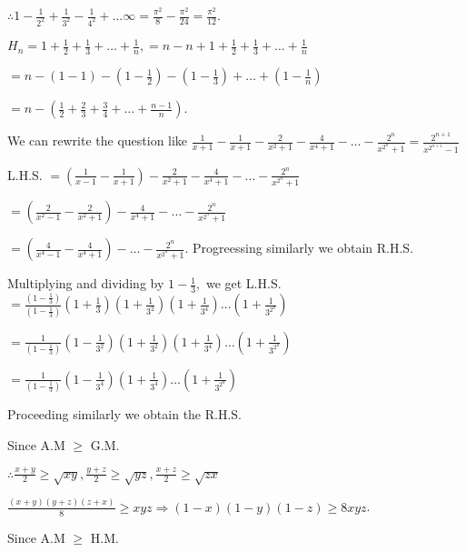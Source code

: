   $\therefore 1- \frac{1}{2^2} + \frac{1}{3^2} - \frac{1}{4^2} + \ldots \infty = \frac{\pi^2}{8} - \frac{\pi^2}{24} =
  \frac{\pi^2}{12}$.
\item $H_n = 1 + \frac{1}{2} + \frac{1}{3} + \ldots + \frac{1}{n}, = n - n + 1 + \frac{1}{2} + \frac{1}{3} +
  \ldots + \frac{1}{n}$

  $= n -\left(1 - 1\right) - \left(1 - \frac{1}{2}\right) - \left(1 - \frac{1}{3}\right) + \ldots + \left(1
  - \frac{1}{n}\right)$

  $= n - \left(\frac{1}{2} + \frac{2}{3} + \frac{3}{4} + \ldots + \frac{n - 1}{n}\right)$.
\item We can rewrite the question like $\frac{1}{x + 1} - \frac{1}{x + 1} - \frac{2}{x^2 + 1} - \frac{4}{x^4 + 1} -
  \ldots - \frac{2^n}{x^{2^{n}} + 1} = \frac{2^{n + 1}}{x^{2^{n + 1}} - 1}$

  L.H.S. $= \left(\frac{1}{x - 1} - \frac{1}{x + 1}\right) - \frac{2}{x^2 + 1} - \frac{4}{x^4 + 1} - \ldots
  - \frac{2^n}{x^{2^{n}} + 1}$

  $= \left(\frac{2}{x^2 - 1} - \frac{2}{x^2 + 1}\right) - \frac{4}{x^4 + 1} - \ldots - \frac{2^n}{x^{2^{n}}
    + 1}$

  $= \left(\frac{4}{x^4 - 1} - \frac{4}{x^4 + 1}\right) - \ldots - \frac{2^n}{x^{2^{n}} + 1}$. Progreessing
  similarly we obtain R.H.S.
\item Multiplying and dividing by $1 - \frac{1}{3},$ we get
  L.H.S. $= \frac{\left(1 - \frac{1}{3}\right)}{\left(1 - \frac{1}{3}\right)}\left(1 + \frac{1}{3}\right)\left(1 +
  \frac{1}{3^2}\right)\left(1 + \frac{1}{3^4}\right) \ldots \left(1 + \frac{1}{3^{2^{n}}}\right)$

  $= \frac{1}{\left(1 - \frac{1}{3}\right)}\left(1 - \frac{1}{3^2}\right)\left(1 + \frac{1}{3^2}\right)\left(1 +
  \frac{1}{3^4}\right) \ldots \left(1 + \frac{1}{3^{2^{n}}}\right)$

  $= \frac{1}{\left(1 - \frac{1}{3}\right)}\left(1 - \frac{1}{3^4}\right)\left(1 + \frac{1}{3^4}\right) \ldots \left(1 +
  \frac{1}{3^{2^{n}}}\right)$

  Proceeding similarly we obtain the R.H.S.
\item Since A.M $\geq$ G.M.

  $\therefore \frac{x + y}{2}\geq \sqrt{xy}, \frac{y + z}{2}\geq \sqrt{yz}, \frac{x + z}{2}\geq \sqrt{zx}$

  $\frac{(x + y)(y + z)(z + x)}{8}\geq xyz \Rightarrow (1 - x)(1 - y)(1 - z)\geq 8xyz$.
\item Since A.M $\geq$ H.M.

